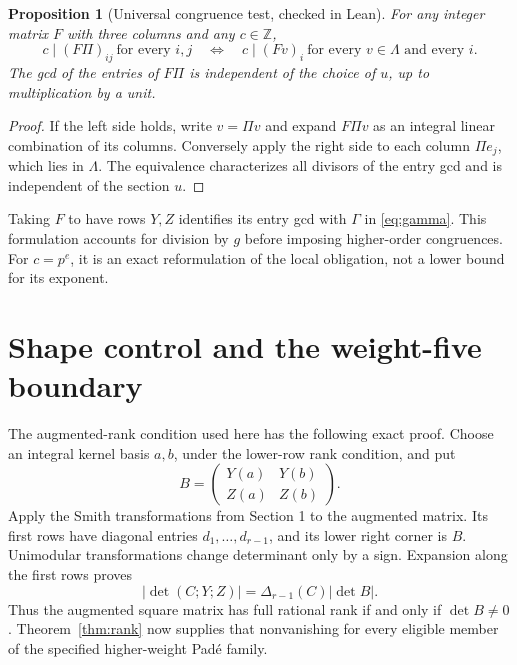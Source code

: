 \documentclass[11pt]{article}
\newtheorem{proposition}[theorem]{Proposition}
\theoremstyle{remark}
\newcommand{\Z}{\mathbb Z}
\begin{document}
\begin{proposition}[Universal congruence test, checked in Lean]
For any integer matrix \(F\) with three columns and any \(c\in\Z\),
\begin{equation}
 c\mid(F\Pi)_{ij}\ \text{for every }i,j
 \quad\Longleftrightarrow\quad
 c\mid(Fv)_i\ \text{for every }v\in\Lambda\text{ and every }i.
 \label{eq:projector}
\end{equation}
The gcd of the entries of \(F\Pi\) is independent of the choice of \(u\),
up to multiplication by a unit.
\end{proposition}
\begin{proof}
If the left side holds, write \(v=\Pi v\) and expand \(F\Pi v\)
as an integral linear combination of its columns.
Conversely apply the right side to each column \(\Pi e_j\), which
lies in \(\Lambda\). The equivalence characterizes all divisors of
the entry gcd and is independent of the section \(u\).
\end{proof}
Taking \(F\) to have rows \(Y,Z\) identifies its entry gcd with
\(\Gamma\) in \eqref{eq:gamma}. This formulation accounts for division
by \(g\) before imposing higher-order congruences. For \(c=p^e\), it
is an exact reformulation of the local obligation, not a lower bound
for its exponent.

\section{Shape control and the weight-five boundary}
\label{sec:shape}
The augmented-rank condition used here has the following exact proof.
Choose an integral kernel basis \(a,b\), under the lower-row rank condition,
and put
\[
 B=\begin{pmatrix}Y(a)&Y(b)\\ Z(a)&Z(b)\end{pmatrix}.
\]
Apply the Smith transformations from Section 1 to the augmented matrix.
Its first rows have diagonal entries \(d_1,\ldots,d_{r-1}\), and its
lower right corner is \(B\). Unimodular transformations change determinant
only by a sign. Expansion along the first rows proves
\begin{equation}
 |\det(C;Y;Z)|=\Delta_{r-1}(C)|\det B|.
 \label{eq:augmented}
\end{equation}
Thus the augmented square matrix has full rational rank if and only if
\(\det B\ne0\). Theorem~\ref{thm:rank} now supplies that nonvanishing
for every eligible member of the specified higher-weight Pad\'e family.
\end{document}
